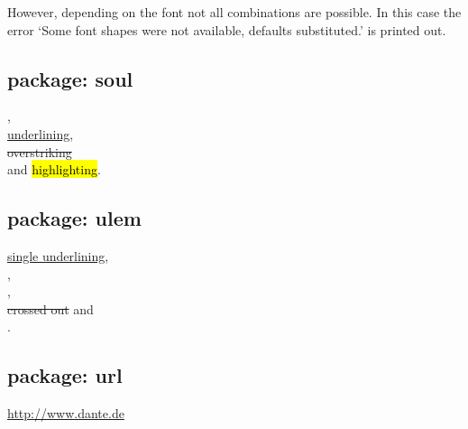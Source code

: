 %
%
However, depending on the font not all combinations are possible.
In this case the error `Some font shapes were not available, 
defaults substituted.' is printed out.

\subsection{package: soul}

\begin{filecontents*}{\democodefile}
, \\
\ul{underlining},   \\
\st{overstriking}   \\
and \hl{highlighting}. 
\end{filecontents*}

%

\subsection{package: ulem}

\begin{filecontents*}{\democodefile}
\uline{single underlining}, \\
, \\
, \\
\sout{crossed out} and \\
.
\end{filecontents*}

%

\subsection{package: url}

\begin{filecontents*}{\democodefile}
\url{http://www.dante.de}
\end{filecontents*}

